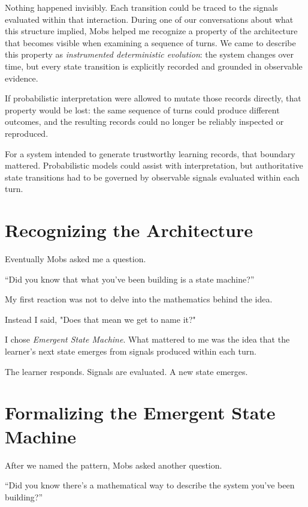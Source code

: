 \documentclass[11pt]{article}
\begin{document}
Nothing happened invisibly. Each transition could be traced to the signals evaluated within that interaction. During one of our conversations about what this structure implied, Mobs helped me recognize a property of the architecture that becomes visible when examining a sequence of turns. We came to describe this property as \textit{instrumented deterministic evolution}: the system changes over time, but every state transition is explicitly recorded and grounded in observable evidence.

If probabilistic interpretation were allowed to mutate those records directly, that property would be lost: the same sequence of turns could produce different outcomes, and the resulting records could no longer be reliably inspected or reproduced.

For a system intended to generate trustworthy learning records, that boundary mattered. Probabilistic models could assist with interpretation, but authoritative state transitions had to be governed by observable signals evaluated within each turn.

\section{Recognizing the Architecture}

Eventually Mobs asked me a question.

“Did you know that what you’ve been building is a state machine?”

My first reaction was not to delve into the mathematics behind the idea.

Instead I said, "Does that mean we get to name it?"

I chose \textit{Emergent State Machine}. What mattered to me was the idea that the learner’s next state emerges from signals produced within each turn.

The learner responds. Signals are evaluated. A new state emerges.



\section{Formalizing the Emergent State Machine}

After we named the pattern, Mobs asked another question.

“Did you know there’s a mathematical way to describe the system you’ve been building?”
\end{document}
